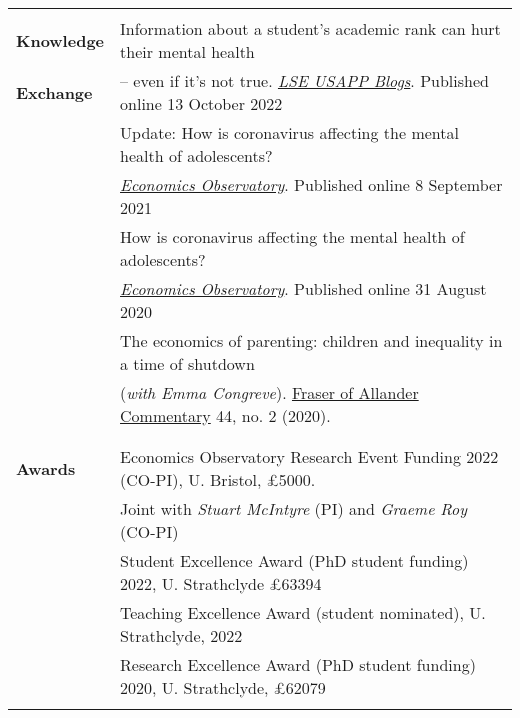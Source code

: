 \documentclass[11pt,a4paper]{article}
\begin{document}
\begin{longtable}{l l}
{																							&      \\
\textbf{Knowledge}                      &  Information about a student’s academic rank can hurt their mental health  \\ 
\textbf{Exchange} 									       &  – even if it’s not true. \href{https://bit.ly/3CVAiGP}{\textit{LSE USAPP Blogs}}. Published online 13 October 2022    \\
\addlinespace
																												 &  Update: How is coronavirus affecting the mental health of adolescents?    \\
 										 																		 &  \href{https://www.economicsobservatory.com/update-how-is-coronavirus-affecting-the-mental-health-of-adolescents}{\textit{Economics Observatory}}. Published online 8 September 2021    \\
\addlinespace
																												&  How is coronavirus affecting the mental health of adolescents?   \\
																												&  \href{https://www.economicsobservatory.com/how-coronavirus-affecting-mental-health-adolescents}{\textit{Economics Observatory}}. Published online 31 August 2020  \\		
\addlinespace
																												&  The economics of parenting: children and inequality in a time of shutdown  \\ 
																												& (\textit{with Emma Congreve}). \href{https://strathprints.strath.ac.uk/74641/}{Fraser of Allander Commentary} 44, no. 2 (2020).  \\
																												&   \\	
																												&  \\   %
\textbf{Awards}                            &  Economics Observatory Research Event Funding 2022 (CO-PI), U. Bristol, \pounds5000.   \\
																												&  Joint with \textit{Stuart McIntyre} (PI) and \textit{Graeme Roy} (CO-PI)   \\
\addlinespace
																												&  Student Excellence Award (PhD student funding) 2022, U. Strathclyde \pounds63394   \\
\addlinespace
																												& Teaching Excellence Award (student nominated), U. Strathclyde, 2022   \\																														
\addlinespace
																												&  Research Excellence Award (PhD student funding)	 2020, U. Strathclyde, \pounds62079   \\																									
}
\end{longtable}
\end{document}

